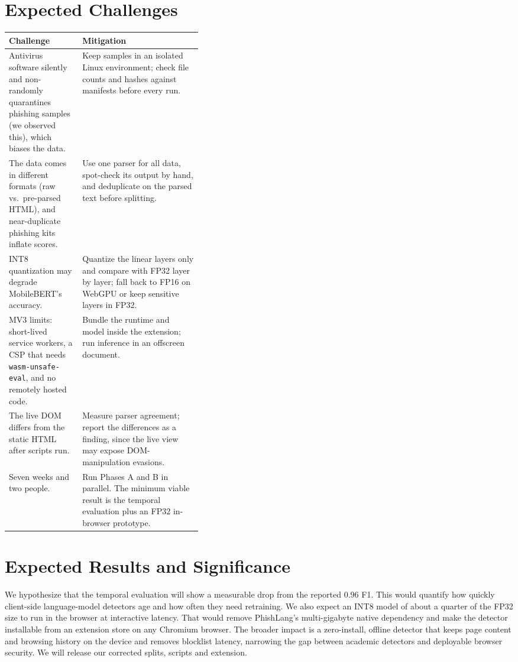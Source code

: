 \documentclass[11pt]{article}
\begin{document}
\section{Expected Challenges}
{\small\noindent\begin{tabularx}{\linewidth}{@{}>{\raggedright\arraybackslash}p{0.38\linewidth}X@{}}
\toprule
\textbf{Challenge} & \textbf{Mitigation} \\
\midrule
Antivirus software silently and non-randomly quarantines phishing samples (we observed this), which biases the data. & Keep samples in an isolated Linux environment; check file counts and hashes against manifests before every run. \\[2pt]
The data comes in different formats (raw vs.\ pre-parsed HTML), and near-duplicate phishing kits inflate scores. & Use one parser for all data, spot-check its output by hand, and deduplicate on the parsed text before splitting. \\[2pt]
INT8 quantization may degrade MobileBERT's accuracy. & Quantize the linear layers only and compare with FP32 layer by layer; fall back to FP16 on WebGPU or keep sensitive layers in FP32. \\[2pt]
MV3 limits: short-lived service workers, a CSP that needs \texttt{wasm-unsafe-eval}, and no remotely hosted code. & Bundle the runtime and model inside the extension; run inference in an offscreen document. \\[2pt]
The live DOM differs from the static HTML after scripts run. & Measure parser agreement; report the differences as a finding, since the live view may expose DOM-manipulation evasions. \\[2pt]
Seven weeks and two people. & Run Phases A and B in parallel. The minimum viable result is the temporal evaluation plus an FP32 in-browser prototype. \\
\bottomrule
\end{tabularx}}

\section{Expected Results and Significance}
We hypothesize that the temporal evaluation will show a measurable drop from the reported 0.96 F1. This would quantify how quickly client-side language-model detectors age and how often they need retraining. We also expect an INT8 model of about a quarter of the FP32 size to run in the browser at interactive latency. That would remove PhishLang's multi-gigabyte native dependency and make the detector installable from an extension store on any Chromium browser. The broader impact is a zero-install, offline detector that keeps page content and browsing history on the device and removes blocklist latency, narrowing the gap between academic detectors and deployable browser security. We will release our corrected splits, scripts and extension.
\end{document}
